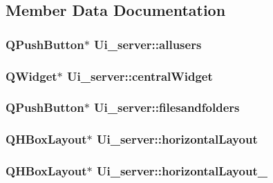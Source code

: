 \subsection{Member Data Documentation}
\hypertarget{classUi__server_aa6b96658250a8b72faca552f0be913d8}{
\subsubsection[{allusers}]{\setlength{\rightskip}{0pt plus 5cm}Q\-Push\-Button$\ast$ Ui\-\_\-server\-::allusers}}\label{classUi__server_aa6b96658250a8b72faca552f0be913d8}
\hypertarget{classUi__server_a0e286bf6515d46d0ce1eaf6b631bd145}{
\subsubsection[{central\-Widget}]{\setlength{\rightskip}{0pt plus 5cm}Q\-Widget$\ast$ Ui\-\_\-server\-::central\-Widget}}\label{classUi__server_a0e286bf6515d46d0ce1eaf6b631bd145}
\hypertarget{classUi__server_ad362cc1da064ad825926d87bf6644276}{
\subsubsection[{filesandfolders}]{\setlength{\rightskip}{0pt plus 5cm}Q\-Push\-Button$\ast$ Ui\-\_\-server\-::filesandfolders}}\label{classUi__server_ad362cc1da064ad825926d87bf6644276}
\hypertarget{classUi__server_a11a951ba853e0f94d57704a76088ce54}{
\subsubsection[{horizontal\-Layout}]{\setlength{\rightskip}{0pt plus 5cm}Q\-H\-Box\-Layout$\ast$ Ui\-\_\-server\-::horizontal\-Layout}}\label{classUi__server_a11a951ba853e0f94d57704a76088ce54}
\hypertarget{classUi__server_a236a5c76ab01aa3a54fc1c7f87dbd2e6}{
\subsubsection[{horizontal\-Layout\-\_\-2}]{\setlength{\rightskip}{0pt plus 5cm}Q\-H\-Box\-Layout$\ast$ Ui\-\_\-server\-::horizontal\-Layout\-\_}}\label{classUi__server_a236a5c76ab01aa3a54fc1c7f87dbd2e6}
